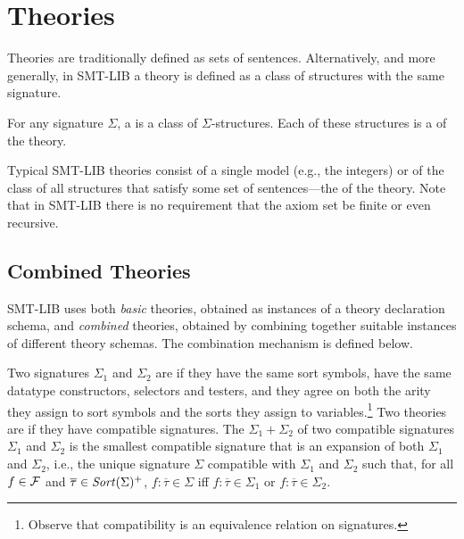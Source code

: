 \section{Theories} \label{sec:theories}

Theories are traditionally defined as sets of sentences.
Alternatively, and more generally, 
in SMT-LIB a theory is defined as a class of structures with the same signature.

\begin{definition}[Theory]
For any signature $\Sigma$,
a  is a class of $\Sigma$-structures.
Each of these structures is a  of the theory.
\end{definition}

Typical SMT-LIB theories consist of a single model 
(e.g., the integers)
or 
of the class of all structures that satisfy some set of sentences---the
 of the theory.
Note that in SMT-LIB there is no requirement that the axiom set be
finite or even recursive.


\subsection{Combined Theories} \label{sec:comb-theories}

SMT-LIB uses both \emph{basic} theories, 
obtained as instances of a theory declaration schema,
and \emph{combined} theories, obtained by combining together
suitable instances of different theory sche\-mas.
The combination mechanism is defined below.

Two signatures $\Sigma_1$ and $\Sigma_2$ are  
if they have the same sort symbols, 
have the same datatype constructors, selectors and testers, and they agree 
on both the arity they assign to sort symbols and 
the sorts they assign to variables.\footnote{%
Observe that compatibility is an equivalence relation on signatures.
}
Two theories are  if they have compatible signatures.
The  $\Sigma_1 + \Sigma_2$
of two compatible signatures $\Sigma_1$ and $\Sigma_2$
is the smallest compatible signature
that is an expansion of both $\Sigma_1$ and $\Sigma_2$,
i.e., the unique signature $\Sigma$ compatible 
with $\Sigma_1$ and $\Sigma_2$ such that,
for all $f \in \mathcal{F}$ and $\overline{\tau} \in \mathit{Sort}(\Sigma)^+$,
$f{:}\overline{\tau} \in \Sigma$ iff 
$f{:}\overline{\tau} \in \Sigma_1$ or
$f{:}\overline{\tau} \in \Sigma_2$.

